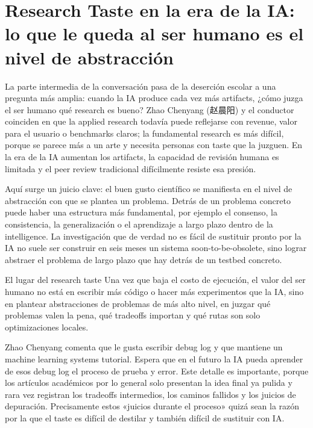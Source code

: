 \documentclass[a4paper]{article}
\begin{document}
\section{Research Taste en la era de la IA: lo que le queda al ser humano es el nivel de abstracción}

La parte intermedia de la conversación pasa de la deserción escolar a una pregunta más amplia: cuando la IA produce cada vez más artifacts, ¿cómo juzga el ser humano qué research es bueno? Zhao Chenyang (赵晨阳) y el conductor coinciden en que la applied research todavía puede reflejarse con revenue, valor para el usuario o benchmarks claros; la fundamental research es más difícil, porque se parece más a un arte y necesita personas con taste que la juzguen. En la era de la IA aumentan los artifacts, la capacidad de revisión humana es limitada y el peer review tradicional difícilmente resiste esa presión.

Aquí surge un juicio clave: el buen gusto científico se manifiesta en el nivel de abstracción con que se plantea un problema. Detrás de un problema concreto puede haber una estructura más fundamental, por ejemplo el consenso, la consistencia, la generalización o el aprendizaje a largo plazo dentro de la intelligence. La investigación que de verdad no es fácil de sustituir pronto por la IA no suele ser construir en seis meses un sistema soon-to-be-obsolete, sino lograr abstraer el problema de largo plazo que hay detrás de un testbed concreto.

\begin{importantbox}{El lugar del research taste}
Una vez que baja el costo de ejecución, el valor del ser humano no está en escribir más código o hacer más experimentos que la IA, sino en plantear abstracciones de problemas de más alto nivel, en juzgar qué problemas valen la pena, qué tradeoffs importan y qué rutas son solo optimizaciones locales.
\end{importantbox}

Zhao Chenyang comenta que le gusta escribir debug log y que mantiene un machine learning systems tutorial. Espera que en el futuro la IA pueda aprender de esos debug log el proceso de prueba y error. Este detalle es importante, porque los artículos académicos por lo general solo presentan la idea final ya pulida y rara vez registran los tradeoffs intermedios, los caminos fallidos y los juicios de depuración. Precisamente estos «juicios durante el proceso» quizá sean la razón por la que el taste es difícil de destilar y también difícil de sustituir con IA.
\end{document}
